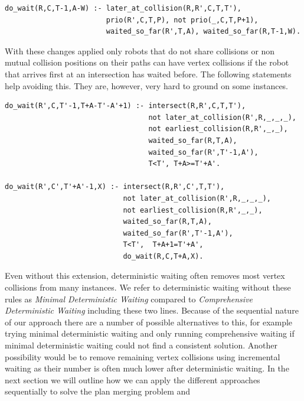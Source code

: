\documentclass{llncs}
\begin{document}
\begin{verbatim}
do_wait(R,C,T-1,A-W) :- later_at_collision(R,R',C,T,T'), 
                        prio(R',C,T,P), not prio(_,C,T,P+1),
                        waited_so_far(R',T,A), waited_so_far(R,T-1,W).
\end{verbatim}
With these changes applied only  robots that do not share collisions or non mutual collision positions on their paths can have vertex collisions if the robot that arrives first at an intersection has waited before. The following statements help avoiding this. They are, however, very hard to ground on some instances. 
\begin{verbatim}
do_wait(R',C,T'-1,T+A-T'-A'+1) :- intersect(R,R',C,T,T'), 
                                  not later_at_collision(R',R,_,_,_), 
                                  not earliest_collision(R,R',_,_),
                                  waited_so_far(R,T,A),
                                  waited_so_far(R',T'-1,A'), 
                                  T<T', T+A>=T'+A'.

do_wait(R',C',T'+A'-1,X) :- intersect(R,R',C',T,T'), 
                            not later_at_collision(R',R,_,_,_), 
                            not earliest_collision(R,R',_,_), 
                            waited_so_far(R,T,A), 
                            waited_so_far(R',T'-1,A'), 
                            T<T',  T+A+1=T'+A', 
                            do_wait(R,C,T+A,X).

\end{verbatim}
Even without this extension, deterministic waiting often removes most vertex collisions from many instances. We refer to deterministic waiting without these rules as \emph{Minimal Deterministic Waiting} compared to \emph{Comprehensive Deterministic Waiting} including these two lines.
Because of the sequential nature of our approach there are a number of possible alternatives to this, for example trying minimal deterministic waiting and only running comprehensive waiting if minimal deterministic waiting could not find a consistent solution. Another possibility would be to remove remaining vertex collisions using incremental waiting as their number is often much lower after deterministic waiting.
In the next section we will outline how we can apply the different approaches sequentially to solve the plan merging problem and 
\end{document}
